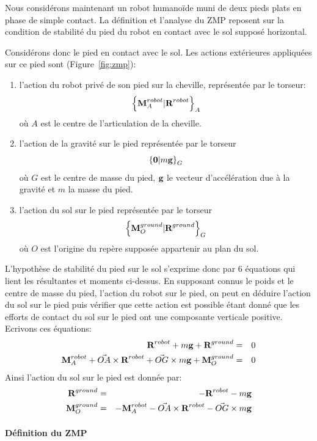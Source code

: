 Nous considérons maintenant un robot humanoïde muni de deux pieds
plats en phase de simple contact. La définition et l'analyse du ZMP
reposent sur la condition de stabilité du pied du robot en contact avec
le sol supposé horizontal.

Considérons donc le pied en contact avec le sol. Les actions
extérieures appliquées sur ce pied sont (Figure \ref{fig:zmp}):
\begin{enumerate}
  \item l'action du robot privé de son pied sur la cheville,
    représentée par le torseur:
    $$
    \left\{\textbf{M}^{robot}_A | \textbf{R}^{robot} \right\}_{A}
    $$
    où $A$ est le centre de l'articulation de la cheville.
  \item l'action de la gravité sur le pied représentée par le torseur
    $$
    \left\{\textbf{0} | m \textbf{g} \right\}_{G}
    $$
    où $G$ est le centre de masse du pied, $\textbf{g}$ le vecteur
    d'accélération due à la gravité et $m$ la masse du pied.
  \item l'action du sol sur le pied représentée par le torseur
    $$
    \left\{\textbf{M}^{ground}_O | \textbf{R}^{ground} \right\}_{G}
    $$
    où $O$ est l'origine du repère supposée appartenir au plan du sol.
\end{enumerate}
L'hypothèse de stabilité du pied sur le sol s'exprime donc par 6
équations qui lient les résultantes et moments ci-dessus. En supposant
connus le poids et le centre de masse du pied, l'action du robot sur
le pied, on peut en déduire l'action du sol sur le pied puis vérifier
que cette action est possible étant donné que les efforts de contact
du sol sur le pied ont une composante verticale positive.
Ecrivons ces équations:
\begin{eqnarray*}
  \textbf{R}^{robot}+ m \textbf{g}+ \textbf{R}^{ground} &=& 0 \\
  \textbf{M}^{robot}_A + \vec{OA}\times\textbf{R}^{robot}
  +\vec{OG}\times m\textbf{g} + \textbf{M}^{ground}_O &=& 0
\end{eqnarray*}
Ainsi l'action du sol sur le pied est donnée par:
\begin{eqnarray*}
  \textbf{R}^{ground} &=& -\textbf{R}^{robot} - m \textbf{g} \\
  \textbf{M}^{ground}_O &=& -\textbf{M}^{robot}_A - \vec{OA}\times\textbf{R}^{robot}
  - \vec{OG}\times m\textbf{g}
\end{eqnarray*}

\paragraph{Définition du ZMP}


